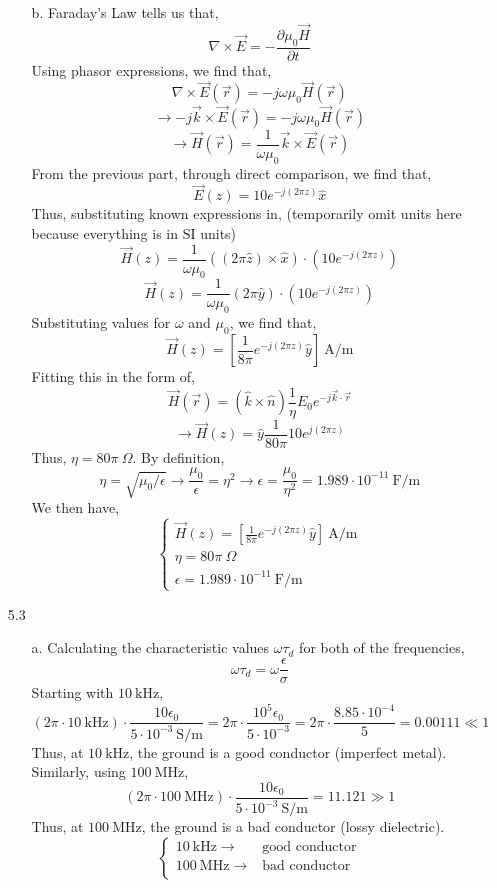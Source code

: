 \documentclass[12pt]{article}
\begin{document}
\begin{enumerate}
\begin{enumerate}
		\item [b.]
		Faraday's Law tells us that,
		\[\nabla \times \vec E = -\frac{\partial \mu_0 \vec H}{\partial t}\]
		Using phasor expressions, we find that,
		\[\nabla \times \vec E(\vec r) = -j\omega \mu_0\vec H(\vec r)\]
		\[\to -j\vec k \times \vec E(\vec r)=-j\omega \mu_0\vec H(\vec r)\]
		\[\to \vec H(\vec r)=\frac{1}{\omega \mu_0}\vec k \times \vec E(\vec r)\]
		From the previous part, through direct comparison, we find that,
		\[\vec E(z) = 10e^{-j(2\pi z)}\hat x\]
		Thus, substituting known expressions in, (temporarily omit units here because everything is in SI units)
		\[\vec H(z)=\frac{1}{\omega \mu_0}((2\pi \hat z) \times \hat x)\cdot (10e^{-j(2\pi z)})\]
		\[\vec H(z)=\frac{1}{\omega \mu_0}(2\pi \hat y)\cdot (10e^{-j(2\pi z)})\]
		Substituting values for $\omega$ and $\mu_0$, we find that,
		\[\vec H(z)=\left[\frac{1}{8\pi}e^{-j(2\pi z)}\hat y\right] \: \mathrm{A/m}\]
		Fitting this in the form of,
		\[\vec H(\vec r)=(\hat k \times \hat n)\frac{1}{\eta}E_0e^{-j\vec k \cdot \vec r}\]
		\[\to \vec H(z)=\hat y\frac{1}{80\pi}10e^{j(2\pi z)}\]
		Thus, $\eta = 80\pi\:\Omega$.
		By definition, 
		\[\eta=\sqrt{\mu_0/\epsilon}\to \frac{\mu_0}{\epsilon}=\eta^2 \to \epsilon = \frac{\mu_0}{\eta^2}=1.989\cdot 10^{-11}\:\mathrm{F/m}\]
		We then have,
		\[\boxed{\begin{cases}
			\vec H(z)=\left[\frac{1}{8\pi}e^{-j(2\pi z)}\hat y\right] \: \mathrm{A/m} \\ 
			\eta = 80 \pi \: \Omega \\ 
			\epsilon = 1.989 \cdot 10^{-11} \: \mathrm{F/m}
		\end{cases}}\]


	\end{enumerate}

	\item [5.3]
	\begin{enumerate}
		\item [a.]
		Calculating the characteristic values $\omega \tau_d$ for both of the frequencies,
		\[\omega \tau_d = \omega \frac{\epsilon}{\sigma}\]
		Starting with $10 \: \mathrm{kHz}$,
		\[(2\pi \cdot 10 \: \mathrm{kHz})\cdot \frac{10\epsilon_0}{5\cdot 10^{-3}\:\mathrm{S/m}}=2\pi\cdot \frac{10^5 \epsilon_0}{5\cdot 10^{-3}}=2\pi \cdot \frac{8.85\cdot 10^{-4}}{5}=0.00111 \ll 1\]
		Thus, at $10\:\mathrm{kHz}$, the ground is a good conductor (imperfect metal).
		Similarly, using $100 \: \mathrm{MHz}$,
		\[(2\pi \cdot 100 \: \mathrm{MHz})\cdot \frac{10\epsilon_0}{5\cdot 10^{-3}\:\mathrm{S/m}}=11.121 \gg 1\]
		Thus, at $100 \: \mathrm{MHz}$, the ground is a bad conductor (lossy dielectric).
		\[\boxed{\begin{cases}
			10 \: \mathrm{kHz}\to & \text{good conductor} \\ 	
			100 \: \mathrm{MHz}\to & \text{bad conductor} \\ 	
		\end{cases}}\]


\end{enumerate}
\end{enumerate}
\end{document}
